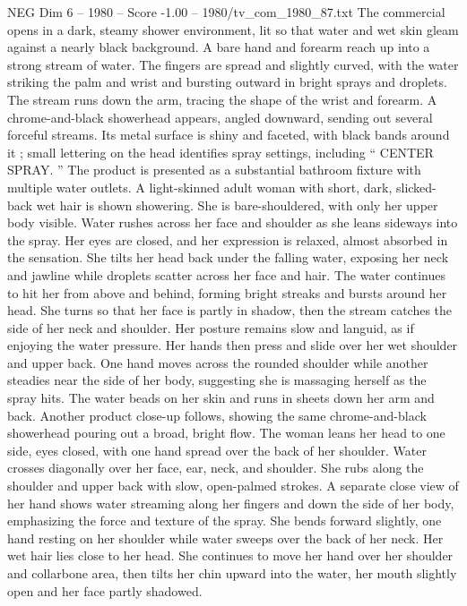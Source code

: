 \begin{textsample}{NEG Dim 6 – 1980 – Score -1.00 – 1980/tv\_com\_1980\_87.txt}  \label{ex:f6_neg_063}
The commercial opens in a dark, steamy shower environment, lit so that water and wet skin gleam against a nearly black background.
A bare hand and forearm reach up into a strong stream of water.
The fingers are spread and slightly curved, with the water striking the palm and wrist and bursting outward in bright sprays and droplets.
The stream runs down the arm, tracing the shape of the wrist and forearm.
A chrome-and-black showerhead appears, angled downward, sending out several forceful streams.
Its metal surface is shiny and faceted, with black bands around it ; small lettering on the head identifies spray settings, including “ CENTER SPRAY. ” The product is presented as a substantial bathroom fixture with multiple water outlets.
A light-skinned adult woman with short, dark, slicked-back wet hair is shown showering.
She is bare-shouldered, with only her upper body visible.
Water rushes across her face and shoulder as she leans sideways into the spray.
Her eyes are closed, and her expression is relaxed, almost absorbed in the sensation.
She tilts her head back under the falling water, exposing her neck and jawline while droplets scatter across her face and hair.
The water continues to hit her from above and behind, forming bright streaks and bursts around her head.
She turns so that her face is partly in shadow, then the stream catches the side of her neck and shoulder.
Her posture remains slow and languid, as if enjoying the water pressure.
Her hands then press and slide over her wet shoulder and upper back.
One hand moves across the rounded shoulder while another steadies near the side of her body, suggesting she is massaging herself as the spray hits.
The water beads on her skin and runs in sheets down her arm and back.
Another product close-up follows, showing the same chrome-and-black showerhead pouring out a broad, bright flow.
The woman leans her head to one side, eyes closed, with one hand spread over the back of her shoulder.
Water crosses diagonally over her face, ear, neck, and shoulder.
She rubs along the shoulder and upper back with slow, open-palmed strokes.
A separate close view of her hand shows water streaming along her fingers and down the side of her body, emphasizing the force and texture of the spray.
She bends forward slightly, one hand resting on her shoulder while water sweeps over the back of her neck.
Her wet hair lies close to her head.
She continues to move her hand over her shoulder and collarbone area, then tilts her chin upward into the water, her mouth slightly open and her face partly shadowed.

\end{textsample}
